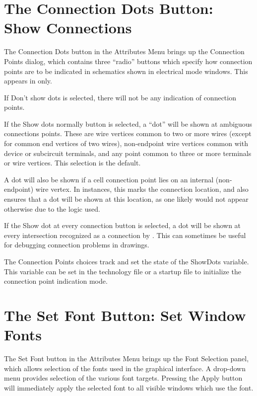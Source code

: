 \section{The {\cb Connection Dots} Button: Show Connections}
The {\cb Connection Dots} button in the {\cb Attributes Menu} brings
up the {\cb Connection Points} dialog, which contains three ``radio''
buttons which specify how connection points are to be indicated in
schematics shown in electrical mode windows.  This appears in {\Xic}
only.

If {\cb Don't show dots} is selected, there will not be any indication
of connection points.

If the {\cb Show dots normally} button is selected, a ``dot'' will be
shown at ambiguous connections points.  These are wire vertices common
to two or more wires (except for common end vertices of two wires),
non-endpoint wire vertices common with device or subcircuit terminals,
and any point common to three or more terminals or wire vertices.
This selection is the default.

A dot will also be shown if a cell connection point lies on an
internal (non-endpoint) wire vertex.  In instances, this marks the
connection location, and also ensures that a dot will be shown at this
location, as one likely would not appear otherwise due to the logic
used.

If the {\cb Show dot at every connection} button is selected, a dot
will be shown at every intersection recognized as a connection by
{\Xic}.  This can sometimes be useful for debugging connection
problems in drawings.

The {\cb Connection Points} choices track and set the state of the
{\et ShowDots} variable.  This variable can be set in the technology
file or a startup file to initialize the connection point indication
mode.


\section{The {\cb Set Font} Button: Set Window Fonts}
The {\cb Set Font} button in the {\cb Attributes Menu} brings up the
{\cb Font Selection} panel, which allows selection of the fonts used
in the graphical interface.  A drop-down menu provides selection of
the various font targets.  Pressing the {\cb Apply} button will
immediately apply the selected font to all visible windows which use
the font.

